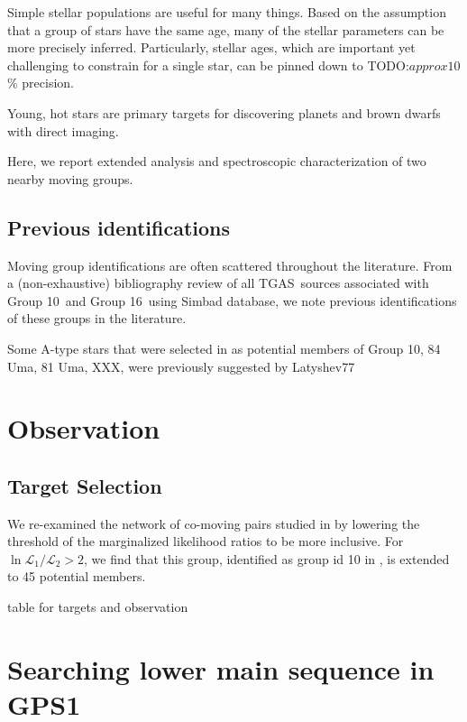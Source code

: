 \documentclass[modern,letterpaper]{aastex61}
\newcommand{\acronym}[1]{{\small{#1}}}
\newcommand{\tgas}{\acronym{TGAS}}
\newcommand{\groupTen}{Group 10}
\newcommand{\groupSixteen}{Group 16}
\newcommand{\todo}[1]{{\color{blue}TODO:#1}}
\begin{document}
Simple stellar populations are useful for many things. Based on the assumption
that a group of stars have the same age, many of the stellar parameters can be
more precisely inferred. Particularly, stellar ages, which are important yet
challenging to constrain for a single star, can be pinned down to
\todo{$approx 10$\%} precision.

Young, hot stars are primary targets for discovering planets and brown dwarfs
with direct imaging.

Here, we report extended analysis and spectroscopic characterization of two
nearby moving groups.

\subsection{Previous identifications}
\label{subsec:history}

Moving group identifications are often scattered throughout the literature.
From a (non-exhaustive) bibliography review of all \tgas\ sources associated
with \groupTen\ and \groupSixteen\ using Simbad database, we note previous
identifications of these groups in the literature.

Some A-type stars that were selected in \citet{2017AJ....153..257O} as potential
members of \groupTen, 84 Uma, 81 Uma, XXX, were previously suggested by
Latyshev77





\section{Observation}
\label{sec:observation}

\subsection{Target Selection}
\label{sub:target_selection}

We re-examined the network of co-moving pairs studied in \citealt{2017AJ....153..257O} by
lowering the threshold of the marginalized likelihood ratios to be more inclusive.
For $\ln{\mathcal{L}_1}/{\mathcal{L}_2}>2$, we find that this group,
identified as group id 10 in \citealt{2017AJ....153..257O}, is extended to 45 potential members.

table for targets and observation

\section{Searching lower main sequence in GPS1}
\label{sec:searching_lower_main_sequence_in_gps1}
\end{document}
